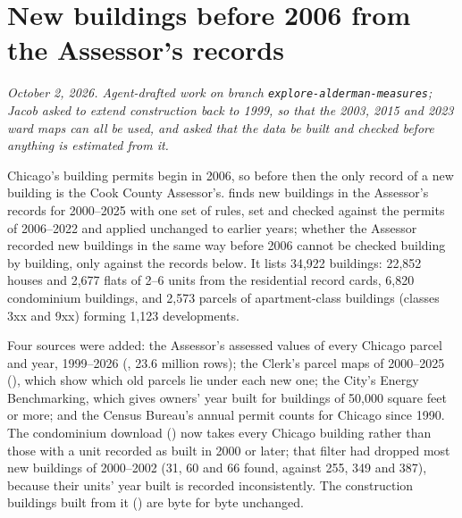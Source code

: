 \clearpage
\section*{New buildings before 2006 from the Assessor's records}
\textit{October 2, 2026. Agent-drafted work on branch \texttt{explore-alderman-measures}; Jacob asked to extend
construction back to 1999, so that the 2003, 2015 and 2023 ward maps can all be used, and asked that the data be built
and checked before anything is estimated from it.}

Chicago's building permits begin in 2006, so before then the only record of a new building is the Cook County Assessor's.
 finds new buildings in the Assessor's records for 2000--2025 with one set of
rules, set and checked against the permits of 2006--2022 and applied unchanged to earlier years; whether the Assessor
recorded new buildings in the same way before 2006 cannot be checked building by building, only against the records
below. It lists 34,922 buildings: 22,852 houses and 2,677 flats of 2--6 units from the residential record cards, 6,820
condominium buildings, and 2,573 parcels of apartment-class buildings (classes 3xx and 9xx) forming 1,123 developments.

Four sources were added: the Assessor's assessed values of every Chicago parcel and year, 1999--2026
(, 23.6 million rows); the Clerk's parcel maps of 2000--2025
(), which show which old parcels lie under each new one; the City's Energy
Benchmarking, which gives owners' year built for buildings of 50,000 square feet or more; and the Census Bureau's
annual permit counts for Chicago since 1990. The condominium download ()
now takes every Chicago building rather than those with a unit recorded as built in 2000 or later; that filter had
dropped most new buildings of 2000--2002 (31, 60 and 66 found, against 255, 349 and 387), because their units' year
built is recorded inconsistently. The construction buildings built from it ()
are byte for byte unchanged.

